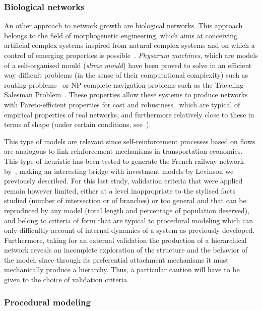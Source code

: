 \documentclass[10pt]{article}
\begin{document}
\subsubsection{Biological networks}

An other approach to network growth are biological networks. This approach belongs to the field of morphogenetic engineering, which aims at conceiving artificial complex systems inspired from natural complex systems and on which a control of emerging properties is possible~\cite{doursat2012morphogenetic}. \emph{Physarum machines}, which are models of a self-organised mould (\emph{slime mould}) have been proved to solve in an efficient way difficult problems (in the sense of their computational complexity) such as routing problems~\cite{tero2006physarum} or NP-complete navigation problems such as the Traveling Salesman Problem~\cite{zhu2013amoeba}. These properties allow these systems to produce networks with Pareto-efficient properties for cost and robustness~\cite{tero2010rules} which are typical of empirical properties of real networks, and furthermore relatively close to these in terms of shape (under certain conditions, see~\cite{adamatzky2010road}).

This type of models are relevant since self-reinforcement processes based on flows are analogous to link reinforcement mechanisms in transportation economics. This type of heuristic has been tested to generate the French railway network by~\cite{mimeur:tel-01451164}, making an interesting bridge with investment models by Levinson we previously described. For this last study, validation criteria that were applied remain however limited, either at a level inappropriate to the stylised facts studied (number of intersection or of branches) or too general and that can be reproduced by any model (total length and percentage of population deserved), and belong to criteria of form that are typical to procedural modeling which can only difficultly account of internal dynamics of a system as previously developed. Furthermore, taking for an external validation the production of a hierarchical network reveals an incomplete exploration of the structure and the behavior of the model, since through its preferential attachment mechanisms it must mechanically produce a hierarchy. Thus, a particular caution will have to be given to the choice of validation criteria.


\subsubsection{Procedural modeling}
\end{document}
